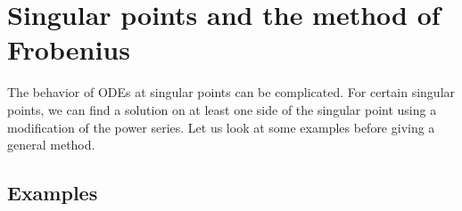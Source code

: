 
\sectionnewpage
\section{Singular points and the method of Frobenius}
\label{frobenius:section}



The behavior of ODEs at singular points can be complicated.
For certain singular points,
we can find a solution on at least one side of the singular point
using a modification of
the power series.
Let us look at some examples before giving a general method.

\subsection{Examples}

